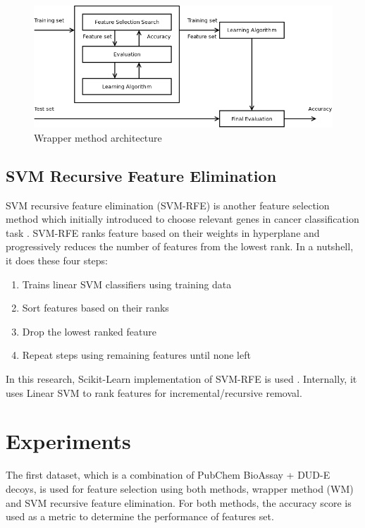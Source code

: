 \documentclass[conference]{IEEEtran}
\begin{document}
\begin{figure}
	\includegraphics[scale=0.3]{../images/wrapper_method.png}
	\caption{Wrapper method architecture \cite{tang2014feature}}
	\label{fig_wrapper_method_architecture}
\end{figure}

\subsection{SVM Recursive Feature Elimination}

SVM recursive feature elimination (SVM-RFE) is another feature selection method which initially introduced to choose relevant genes in cancer classification task \cite{guyon2002gene}. SVM-RFE ranks feature based on their weights in hyperplane and progressively reduces the number of features from the lowest rank. In a nutshell, it does these four steps:

\begin{enumerate}
	\item Trains linear SVM classifiers using training data
	\item Sort features based on their ranks
	\item Drop the lowest ranked feature
	\item Repeat steps using remaining features until none left
\end{enumerate}

In this research, Scikit-Learn implementation of SVM-RFE is used \cite{pedregosa2011scikit}. Internally, it uses Linear SVM to rank features for incremental/recursive removal.

\section{Experiments} \label{Experiments}

The first dataset, which is a combination of PubChem BioAssay + DUD-E decoys, is used for feature selection using both methods, wrapper method (WM) and SVM recursive feature elimination. For both methods, the accuracy score is used as a metric to determine the performance of features set. 
\end{document}
